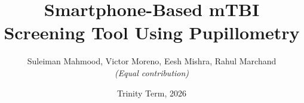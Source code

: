 \documentclass[report]{oxengthesis}
\title       {Smartphone-Based mTBI Screening Tool Using Pupillometry}
\author      {Suleiman Mahmood, Victor Moreno, Eesh Mishra, Rahul Marchand \\ \textit{(Equal contribution)}}
\date        {Trinity Term, 2026}
\begin{document}
\frontmatter
\makefrontmatterpages

\mainmatter









\appendix




\backmatter 
\listofreferences
\end{document}
